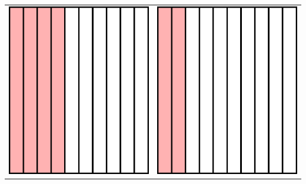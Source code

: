 \documentclass{standalone}
\begin{document}
\begin{tabular}{ll}
\includegraphics{005c.pdf} & \includegraphics{005d.pdf}
\end{tabular}

 
\end{document}
